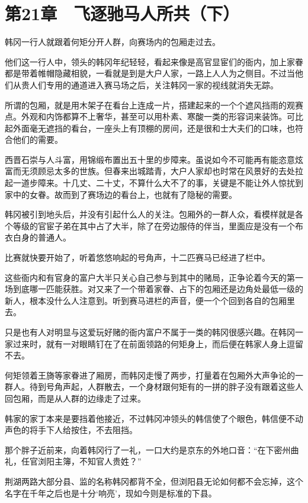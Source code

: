 \section{第21章　飞逐驰马人所共（下）}

韩冈一行人就跟着何矩分开人群，向赛场内的包厢走过去。

他们这一行人中，领头的韩冈年纪轻轻，看起来像是高官显宦们的衙内，加上家眷都是带着帷帽隐藏相貌，一看就是到是大户人家，一路上人人为之侧目。不过当他们从贵人们专用的通道进入赛马场之后，关注韩冈一家的视线就消失无踪。

所谓的包厢，就是用木架子在看台上连成一片，搭建起来的一个个遮风挡雨的观赛点。外观和内饰都算不上奢华，甚至可以用朴素、寒酸一类的形容词来装饰。可比起外面毫无遮挡的看台，一座头上有顶棚的房间，还是很和士大夫们的口味，也符合他们的需要。

西晋石崇与人斗富，用锦缎布置出五十里的步障来。虽说如今不可能再有能恣意炫富而无须顾忌太多的世族。但春来出城踏青，大户人家却也时常在风景好的去处拉起一道步障来。十几丈、二十丈，不算什么大不了的事，关键是不能让外人惊扰到家中的女眷。故而到了赛场边的看台上，也就有了隐秘的需要。

韩冈被引到地头后，并没有引起什么人的关注。包厢外的一群人众，看模样就是各个等级的官宦子弟在其中占了大半，除了在旁边服侍的伴当，里面应是没有一个布衣白身的普通人。

比赛就快要开始了，听着悠悠响起的号角声，十二匹赛马已经进了栏中。

这些衙内和有官身的富户大半只关心自己参与到其中的赌局，正争论着今天的第一场到底哪一匹能获胜。对又来了一个带着家眷、占下的包厢还是边角处最低一级的新人，根本没什么人注意到。听到赛马进栏的声音，便一个个回到各自的包厢里去。

只是也有人对明显与这爱玩好赌的衙内富户不属于一类的韩冈很感兴趣。在韩冈一家过来时，就有一对眼睛钉在了在前面领路的何矩身上，而后便在韩家人身上逗留不去。

何矩领着王旖等家眷进了厢房，而韩冈走慢了两步，打量着在包厢外大声争论的一群人。待到号角声起，人群散去，一个身材跟何矩有的一拼的胖子没有跟着这些人回包厢，而是从人群的边缘走了过来。

韩家的家丁本来是要挡着他接近，不过韩冈冲领头的韩信使了个眼色，韩信便不动声色的将手下人给按住，不去阻挡。

那个胖子近前来，向着韩冈行了一礼，一口大约是京东的外地口音：“在下密州曲礼，任官浏阳主簿，不知官人贵姓？”

荆湖两路大部分县、监的名称韩冈都背不全，但浏阳县无论如何都不会忘掉，这个名字在千年之后也是十分‘响亮’，现如今则是标准的下县。

